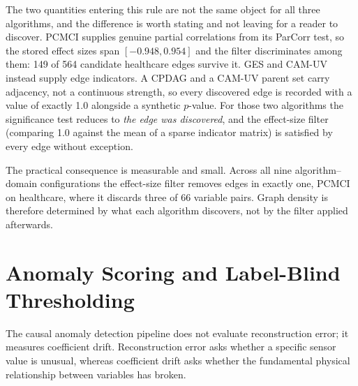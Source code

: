 The two quantities entering this rule are not the same object for all three algorithms, and the difference is worth stating and not leaving for a reader to discover. PCMCI supplies genuine partial correlations from its ParCorr test, so the stored effect sizes span $[-0.948, 0.954]$ and the filter discriminates among them: 149 of 564 candidate healthcare edges survive it. GES and CAM-UV instead supply edge indicators. A CPDAG and a CAM-UV parent set carry adjacency, not a continuous strength, so every discovered edge is recorded with a value of exactly 1.0 alongside a synthetic $p$-value. For those two algorithms the significance test reduces to \emph{the edge was discovered}, and the effect-size filter (comparing 1.0 against the mean of a sparse indicator matrix) is satisfied by every edge without exception.

The practical consequence is measurable and small. Across all nine algorithm--domain configurations the effect-size filter removes edges in exactly one, PCMCI on healthcare, where it discards three of 66 variable pairs. Graph density is therefore determined by what each algorithm discovers, not by the filter applied afterwards.

\section{Anomaly Scoring and Label-Blind Thresholding}
The causal anomaly detection pipeline does not evaluate reconstruction error; it measures coefficient drift. Reconstruction error asks whether a specific sensor value is unusual, whereas coefficient drift asks whether the fundamental physical relationship between variables has broken.

